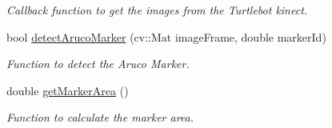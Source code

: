 \begin{DoxyCompactItemize}
\begin{DoxyCompactList}\small\item\em Callback function to get the images from the Turtlebot kinect. \end{DoxyCompactList}\item 
bool \hyperlink{classTurtlebotPerception_a6d28b2ca7782df6f0c7719752f8ea2b8}{detect\+Aruco\+Marker} (cv\+::\+Mat image\+Frame, double marker\+Id)
\begin{DoxyCompactList}\small\item\em Function to detect the Aruco Marker. \end{DoxyCompactList}\item 
double \hyperlink{classTurtlebotPerception_a2b856b1b813c96c6991089615032c8ac}{get\+Marker\+Area} ()
\begin{DoxyCompactList}\small\item\em Function to calculate the marker area. \end{DoxyCompactList}\end{DoxyCompactItemize}
